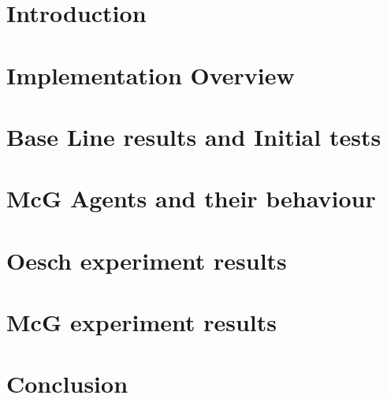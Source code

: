 \documentclass[ %
                    author={Dhammatorn Riewcharoon (dr17549)},
                supervisor={Dr.John Cartlidge},
                    degree={BSc},
                     title={Introducing realistic trading dynamics to the Bristol Stock Exchange},
                  subtitle={},
                      year={2020} ]{dissertation}
\begin{document}
\tableofcontents{}
\newpage
{}
\chapter{Introduction}


\chapter{Implementation Overview} 


\chapter{Base Line results and Initial tests} 


\chapter{McG Agents and their behaviour} 


\chapter{Oesch experiment results} 


\chapter{McG experiment results} 


\chapter{Conclusion} 



% 
\end{document}
